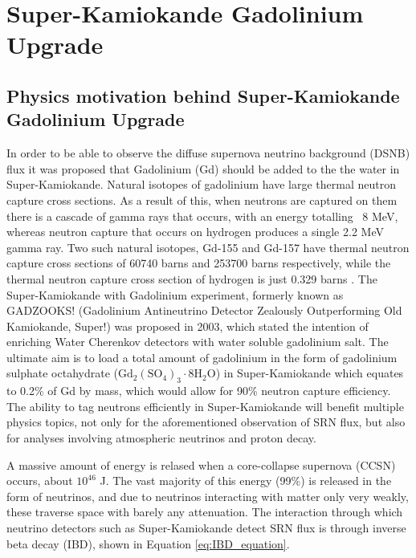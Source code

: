 \chapter{Super-Kamiokande Gadolinium Upgrade}\label{chp:superkgdupgrade}


\section{Physics motivation behind Super-Kamiokande Gadolinium Upgrade}

In order to be able to observe the diffuse supernova neutrino background (DSNB) flux it was proposed that Gadolinium (Gd) should be added to the the water in Super-Kamiokande. Natural isotopes of gadolinium have large thermal neutron capture cross sections. As a result of this, when neutrons are captured on them there is a cascade of gamma rays that occurs, with an energy totalling ~8 MeV, whereas neutron capture that occurs on hydrogen produces a single 2.2 MeV gamma ray. Two such natural isotopes, Gd-155 and Gd-157 have thermal neutron capture cross sections of 60740 barns and 253700 barns respectively, while the thermal neutron capture cross section of hydrogen is just 0.329 barns \cite{meo_measurement_nodate}. The Super-Kamiokande with Gadolinium experiment, formerly known as GADZOOKS! (Gadolinium Antineutrino Detector Zealously Outperforming Old Kamiokande, Super!) was proposed in 2003, which stated the intention of enriching Water Cherenkov detectors with water soluble gadolinium salt. The ultimate aim is to load a total amount of gadolinium in the form of gadolinium sulphate octahydrate ($
\mathrm{Gd}_{2}\left(\mathrm{SO}_{4}\right)_{3} \cdot 8 \mathrm{H}_{2} \mathrm{O}$) in Super-Kamiokande which equates to 0.2\% of Gd by mass, which would allow for 90\% neutron capture efficiency. The ability to tag neutrons efficiently in Super-Kamiokande will benefit multiple physics topics, not only for the aforementioned observation of SRN flux, but also for analyses involving atmospheric neutrinos and proton decay. 
\newline

A massive amount of energy is relased when a core-collapse supernova (CCSN) occurs, about $10^{46}$ J. The vast majority of this energy (99\%) is released in the form of neutrinos, and due to neutrinos interacting with matter only very weakly, these traverse space with barely any attenuation. The interaction through which neutrino detectors such as Super-Kamiokande detect SRN flux is through inverse beta decay (IBD), shown in Equation \ref{eq:IBD_equation}. 


